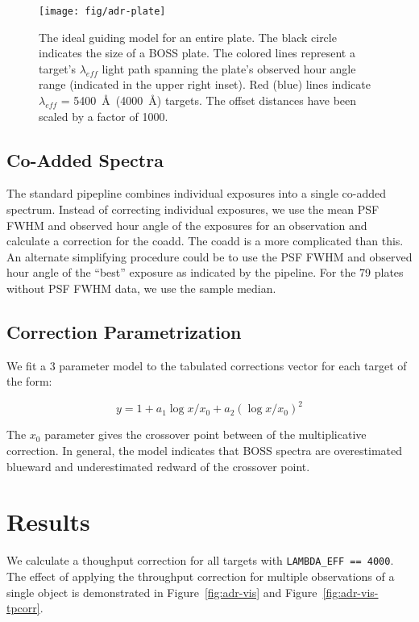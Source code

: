 \documentclass{emulateapj}
\providecommand{\fig}[1]{Figure~\ref{fig:#1}}
\begin{document}
\begin{figure}
\centering
\texttt{[image: fig/adr-plate]}
\caption{The ideal guiding model for an entire plate. The black circle indicates the size of a BOSS plate. The colored lines represent a target's $\lambda_{eff}$ light path spanning the plate's observed hour angle range (indicated in the upper right inset). Red (blue) lines indicate $\lambda_{eff}$ = 5400~\AA~(4000~\AA) targets. The offset distances have been scaled by a factor of 1000.}
\label{fig:plate_guide}
\end{figure}

\subsection{Co-Added Spectra}

The standard pipepline combines individual exposures into a single co-added spectrum. Instead of correcting individual exposures, we use the mean PSF FWHM and observed hour angle of the exposures for an observation and calculate a correction for the coadd. The coadd is a more complicated than this. An alternate simplifying procedure could be to use the PSF FWHM and observed hour angle of the ``best'' exposure as indicated by the pipeline. For the 79 plates without PSF FWHM data, we use the sample median.

\subsection{Correction Parametrization}

We fit a 3 parameter model to the tabulated corrections vector for each target of the form:

\begin{equation}
y = 1 + a_1 \log x/x_0 + a_2 (\log x/x_0)^2
\end{equation}

The $x_0$ parameter gives the crossover point between of the multiplicative correction. In general, the model indicates that BOSS spectra are overestimated blueward and underestimated redward of the crossover point.

\section{Results}

We calculate a thoughput correction for all targets with \texttt{LAMBDA\_EFF == 4000}. The effect of applying the throughput correction for multiple observations of a single object is demonstrated in \fig{adr-vis} and \fig{adr-vis-tpcorr}.
\end{document}
